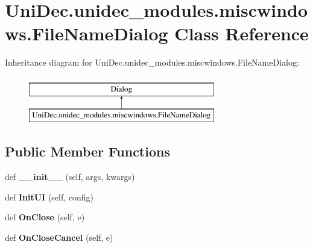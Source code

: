 \hypertarget{class_uni_dec_1_1unidec__modules_1_1miscwindows_1_1_file_name_dialog}{}\section{Uni\+Dec.\+unidec\+\_\+modules.\+miscwindows.\+File\+Name\+Dialog Class Reference}
\label{class_uni_dec_1_1unidec__modules_1_1miscwindows_1_1_file_name_dialog}
Inheritance diagram for Uni\+Dec.\+unidec\+\_\+modules.\+miscwindows.\+File\+Name\+Dialog\+:\begin{figure}[H]
\begin{center}
\leavevmode
\includegraphics[height=2.000000cm]{class_uni_dec_1_1unidec__modules_1_1miscwindows_1_1_file_name_dialog}
\end{center}
\end{figure}
\subsection*{Public Member Functions}
\begin{DoxyCompactItemize}
\item 
\hypertarget{class_uni_dec_1_1unidec__modules_1_1miscwindows_1_1_file_name_dialog_ae755a1aff3d8f148e2b938c9fffd4e7c}{}def {\bfseries \+\_\+\+\_\+init\+\_\+\+\_\+} (self, args, kwargs)\label{class_uni_dec_1_1unidec__modules_1_1miscwindows_1_1_file_name_dialog_ae755a1aff3d8f148e2b938c9fffd4e7c}

\item 
\hypertarget{class_uni_dec_1_1unidec__modules_1_1miscwindows_1_1_file_name_dialog_a588c0f18ece82539cc22124830c832ac}{}def {\bfseries Init\+U\+I} (self, config)\label{class_uni_dec_1_1unidec__modules_1_1miscwindows_1_1_file_name_dialog_a588c0f18ece82539cc22124830c832ac}

\item 
\hypertarget{class_uni_dec_1_1unidec__modules_1_1miscwindows_1_1_file_name_dialog_a87b469ede8d2e9dc9f1d3ffdf8a4d2a7}{}def {\bfseries On\+Close} (self, e)\label{class_uni_dec_1_1unidec__modules_1_1miscwindows_1_1_file_name_dialog_a87b469ede8d2e9dc9f1d3ffdf8a4d2a7}

\item 
\hypertarget{class_uni_dec_1_1unidec__modules_1_1miscwindows_1_1_file_name_dialog_a9a43a91ce972de8d81ab51dffb7d7cd8}{}def {\bfseries On\+Close\+Cancel} (self, e)\label{class_uni_dec_1_1unidec__modules_1_1miscwindows_1_1_file_name_dialog_a9a43a91ce972de8d81ab51dffb7d7cd8}

\end{DoxyCompactItemize}
